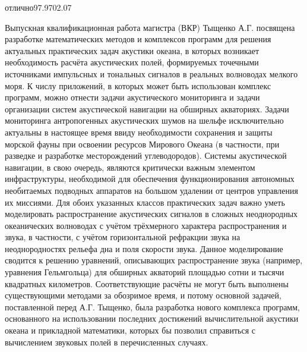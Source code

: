 \documentclass[../document.tex]{subfiles}
\begin{document}
    \begin{supervisorreview}{отлично}{97.97}{02.07}
        \par Выпускная квалификационная работа магистра (ВКР) Тыщенко А.Г. посвящена разработке математических методов и комплексов программ для решения актуальных практических задач акустики океана, в которых возникает необходимость расчёта акустических полей, формируемых точечными источниками импульсных и тональных сигналов в реальных волноводах мелкого моря. К числу приложений, в которых может быть использован комплекс программ, можно отнести задачи акустического мониторинга и задачи организации систем акустической навигации на обширных акваториях. Задачи мониторинга антропогенных акустических шумов на шельфе исключительно актуальны в настоящее время ввиду необходимости сохранения и защиты морской фауны при освоении ресурсов Мирового Океана (в частности, при разведке и разработке месторождений углеводородов). Системы акустической навигации, в свою очередь, являются критически важным элементом инфраструктуры, необходимой для обеспечения функционирования автономных необитаемых подводных аппаратов на большом удалении от центров управления их миссиями. Для обоих указанных классов практических задач важно уметь моделировать распространение акустических сигналов в сложных неоднородных океанических волноводах с учётом трёхмерного характера распространения и звука, в частности, с учётом горизонтальной рефракции звука на неоднородностях рельефа дна и поля скорости звука. Данное моделирование сводится к решению уравнений, описывающих распространение звука (например, уравнения Гельмгольца) для обширных акваторий площадью сотни и тысячи квадратных километров. Соответствующие расчёты не могут быть выполнены существующими методами за обозримое время, и потому основной задачей, поставленной перед А.Г. Тыщенко, была разработка нового комплекса программ, основанного на использовании последних достижений вычислительной акустики океана и прикладной математики, которых бы позволил справиться с вычислением звуковых полей в перечисленных случаях. 

\end{supervisorreview}
\end{document}
